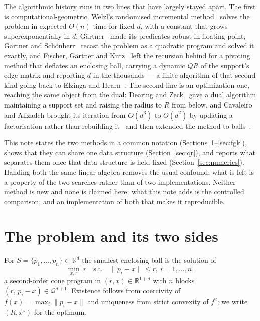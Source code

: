 \documentclass[10pt,a4paper]{article}
\theoremstyle{plain}
\newcommand{\R}{\mathbb{R}}
\newcommand{\norm}[1]{\lVert #1 \rVert}
\begin{document}
The algorithmic history runs in two lines that have largely stayed apart. The
first is computational-geometric. Welzl's randomised incremental
method~\cite{welzl1991} solves the problem in expected $O(n)$ time for fixed $d$,
with a constant that grows superexponentially in $d$; G\"artner~\cite{gaertner1999}
made its predicates robust in floating point, G\"artner and
Sch\"onherr~\cite{gaertner2000} recast the problem as a quadratic program and
solved it exactly, and Fischer, G\"artner and Kutz~\cite{fischer2003} left the
recursion behind for a pivoting method that deflates an enclosing ball, carrying a
dynamic $QR$ of the support's edge matrix and reporting $d$ in the thousands --- a
finite algorithm of that second kind going back to Elzinga and
Hearn~\cite{elzinga1972}. The second line is an optimization one, reaching the same
object from the dual: Dearing and Zeck~\cite{dearing2009} gave a dual algorithm
maintaining a support set and raising the radius to $R$ from below, and Cavaleiro
and Alizadeh brought its iteration from $O(d^3)$ to $O(d^2)$ by updating a
factorisation rather than rebuilding it~\cite{cavaleiro2018} and then extended the
method to balls~\cite{cavaleiro2021}.

This note states the two methods in a common notation
(Sections~\ref{sec:dual}--\ref{sec:fgk}), shows that they can share one data
structure (Section~\ref{sec:qr}), and reports what separates them once that data
structure is held fixed (Section~\ref{sec:numerics}). Handing both the same linear
algebra removes the usual confound: what is left is a property of the two searches
rather than of two implementations. Neither method is new and none is claimed
here; what this note adds is the controlled comparison, and an implementation of
both that makes it reproducible.

\section{The problem and its two sides}
\label{sec:dual}

For $S=\{p_1,\dots,p_n\}\subset\R^d$ the smallest enclosing ball is the solution of
\begin{equation}
  \label{eq:primal}
  \min_{x,r}\ r \quad\text{s.t.}\quad \norm{p_i-x}\le r,\ i=1,\dots,n,
\end{equation}
a second-order cone program in $(r,x)\in\R^{1+d}$ with $n$ blocks
$(r,\,p_i-x)\in\mathcal{Q}^{d+1}$. Existence follows from coercivity of
$f(x)=\max_i\norm{p_i-x}$ and uniqueness from strict convexity of $f^2$; we write
$(R,x^\star)$ for the optimum.
\end{document}
